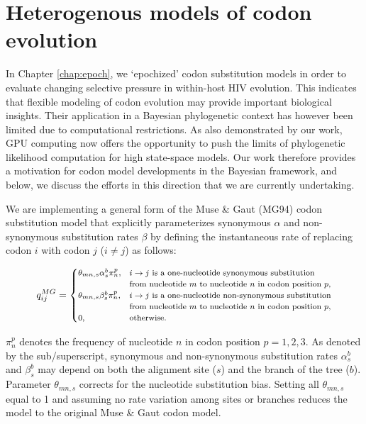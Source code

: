 \section{Heterogenous models of codon evolution\label{sub:dpp}}


In Chapter \ref{chap:epoch}, we `epochized' codon substitution models in order to evaluate changing selective pressure in within-host HIV evolution. 
This indicates that flexible modeling of codon evolution may provide important biological insights. 
Their application in a Bayesian phylogenetic context has however been limited due to computational restrictions. 
As also demonstrated by our work, GPU computing now offers the opportunity to push the limits of phylogenetic likelihood computation for high state-space models. 
Our work therefore provides a motivation for codon model developments in the Bayesian framework, and below, we discuss the efforts in this direction that we are currently undertaking.

We are implementing a general form of the Muse \& Gaut (MG94) codon substitution model \citep{Muse1994} that explicitly parameterizes synonymous $\alpha$ and non-synonymous substitution rates $\beta$ by defining the instantaneous rate of replacing codon $i$ with codon $j$ ($i \neq j$) as follows:

\begin{displaymath}
\footnotesize{
q_{ij}^{MG} = \begin{cases} \theta_{mn,s}\alpha_{s}^{b}\pi_{n}^{p}, & i \to j \text{ is a one-nucleotide synonymous substitution} \\ & \text{from nucleotide $m$ to nucleotide $n$ in codon position $p$,} \\ \theta_{mn,s}\beta_{s}^{b}\pi_{n}^{p}, & i \to j \text{ is a one-nucleotide non-synonymous substitution} \\ & \text{from nucleotide $m$ to nucleotide $n$ in codon position $p$,} \\ 0, & \text{otherwise.} \end{cases}
}
\end{displaymath}

$\pi_{n}^{p}$ denotes the frequency of nucleotide $n$ in codon position $p = 1,2,3$. 
As denoted by the sub/superscript, synonymous and non-synonymous substitution rates $\alpha_{s}^{b}$ and  $\beta_{s}^{b}$ may depend on both the alignment site ($s$) and the branch of the tree ($b$). 
Parameter $\theta_{mn,s}$ corrects for the nucleotide substitution bias. 
Setting all $\theta_{mn,s}$ equal to 1 and assuming no rate variation among sites or branches reduces the model to the original Muse \& Gaut codon model.%

